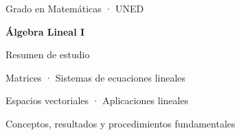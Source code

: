 \documentclass[11pt,a4paper,oneside]{book}
\begin{document}
\frontmatter
\hypersetup{pageanchor=false}
\begin{titlepage}
\centering
\vspace*{3cm}
{\Large Grado en Matemáticas · UNED\par}
\vspace{1.5cm}
{\Huge\bfseries Álgebra Lineal I\par}
\vspace{1cm}
{\Large Resumen de estudio\par}
\vfill
{\large Matrices · Sistemas de ecuaciones lineales\par}
\medskip
{\large Espacios vectoriales · Aplicaciones lineales\par}
\vspace{1cm}
{\small Conceptos, resultados y procedimientos fundamentales\par}
\end{titlepage}
\hypersetup{pageanchor=true}
\tableofcontents
\mainmatter




\end{document}
